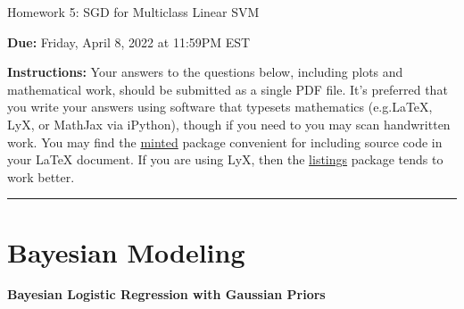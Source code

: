 \documentclass{article}
\newcommand{\nyuparagraph}[1]{\vspace{0.3cm}\textcolor{nyupurple}{\bf \large #1}\\}
\newcommand{\ruleskip}{\bigskip\hrule\bigskip}
\theoremstyle{plain}
\theoremstyle{definition}
\begin{document}

\pagestyle{myheadings} 

\begin{center}
{\Large
Homework 5: SGD for Multiclass Linear SVM
} 
\end{center}

{
{ \color{nyupurple} \textbf{Due:} Friday, April 8, 2022 at 11:59PM EST} 
} 

\textbf{Instructions: }Your answers to the questions below, including plots and mathematical
 work, should be submitted as a single PDF file.  It's preferred that you write your answers using software that typesets mathematics (e.g.LaTeX, LyX, or MathJax via iPython), though if you need to you may scan handwritten work.  You may find the \href{https://github.com/gpoore/minted}{minted} package convenient for including source code in your LaTeX document.  If you are using LyX, then the \href{https://en.wikibooks.org/wiki/LaTeX/Source_Code_Listings}{listings} package tends to work better.

\ruleskip

\section{Bayesian Modeling}
\nyuparagraph{Bayesian Logistic Regression with Gaussian Priors}
\end{document}
